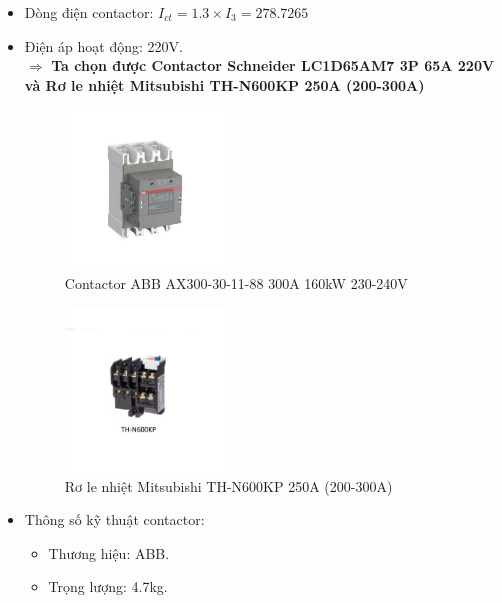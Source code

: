                 \begin{itemize}
                    \item Dòng điện contactor: $I_{ct} = 1.3 \times I_{3} = 278.7265 $ 
                    \item Điện áp hoạt động: 220V.\\[0.2cm]
                        $\Rightarrow$ \textbf{Ta chọn được Contactor Schneider LC1D65AM7 3P 65A 220V và Rơ le nhiệt Mitsubishi TH-N600KP 250A (200-300A)}
                        \begin{figure}[H]
                            \centering
                            \includegraphics[width=0.4\textwidth]{pictures/2d1.png}
                            \caption{Contactor ABB AX300-30-11-88 300A 160kW 230-240V}
                        \end{figure}
                        \begin{figure}[H]
                            \centering
                            \includegraphics[width=0.4\textwidth]{pictures/2d2.png}
                            \caption{Rơ le nhiệt Mitsubishi TH-N600KP 250A (200-300A)}
                        \end{figure}
                    \item Thông số kỹ thuật contactor:
                        \begin{itemize}
                            \item Thương hiệu: ABB.
                            \item Trọng lượng: 4.7kg.

\end{itemize}
\end{itemize}
